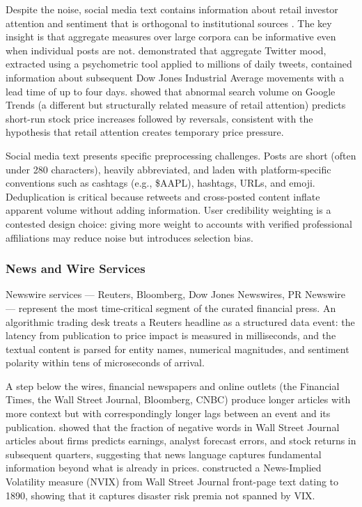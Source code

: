 Despite the noise, social media text contains information about retail investor attention and sentiment that is orthogonal to institutional sources \cite{antweiler2004talking}. The key insight is that aggregate measures over large corpora can be informative even when individual posts are not. \citet{bollen2011twitter} demonstrated that aggregate Twitter mood, extracted using a psychometric tool applied to millions of daily tweets, contained information about subsequent Dow Jones Industrial Average movements with a lead time of up to four days. \citet{da2015sum} showed that abnormal search volume on Google Trends (a different but structurally related measure of retail attention) predicts short-run stock price increases followed by reversals, consistent with the hypothesis that retail attention creates temporary price pressure.

Social media text presents specific preprocessing challenges. Posts are short (often under 280 characters), heavily abbreviated, and laden with platform-specific conventions such as cashtags (e.g., \$AAPL), hashtags, URLs, and emoji. Deduplication is critical because retweets and cross-posted content inflate apparent volume without adding information. User credibility weighting is a contested design choice: giving more weight to accounts with verified professional affiliations may reduce noise but introduces selection bias.

\subsubsection*{News and Wire Services}

Newswire services --- Reuters, Bloomberg, Dow Jones Newswires, PR Newswire --- represent the most time-critical segment of the curated financial press. An algorithmic trading desk treats a Reuters headline as a structured data event: the latency from publication to price impact is measured in milliseconds, and the textual content is parsed for entity names, numerical magnitudes, and sentiment polarity within tens of microseconds of arrival.

A step below the wires, financial newspapers and online outlets (the Financial Times, the Wall Street Journal, Bloomberg, CNBC) produce longer articles with more context but with correspondingly longer lags between an event and its publication. \citet{tetlock2008words} showed that the fraction of negative words in Wall Street Journal articles about firms predicts earnings, analyst forecast errors, and stock returns in subsequent quarters, suggesting that news language captures fundamental information beyond what is already in prices. \citet{manela2017news} constructed a News-Implied Volatility measure (NVIX) from Wall Street Journal front-page text dating to 1890, showing that it captures disaster risk premia not spanned by VIX.


